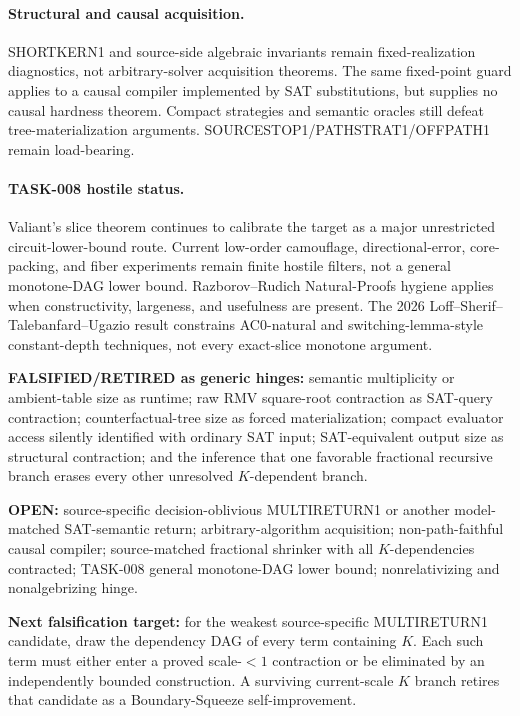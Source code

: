 \documentclass[11pt]{article}
\begin{document}
\paragraph{Structural and causal acquisition.}
SHORTKERN1 and source-side algebraic invariants remain fixed-realization diagnostics, not arbitrary-solver acquisition theorems. The same fixed-point guard applies to a causal compiler implemented by SAT substitutions, but supplies no causal hardness theorem. Compact strategies and semantic oracles still defeat tree-materialization arguments. SOURCESTOP1/PATHSTRAT1/OFFPATH1 remain load-bearing.

\paragraph{TASK-008 hostile status.}
Valiant's slice theorem continues to calibrate the target as a major unrestricted circuit-lower-bound route. Current low-order camouflage, directional-error, core-packing, and fiber experiments remain finite hostile filters, not a general monotone-DAG lower bound. Razborov--Rudich Natural-Proofs hygiene applies when constructivity, largeness, and usefulness are present. The 2026 Loff--Sherif--Talebanfard--Ugazio result constrains AC0-natural and switching-lemma-style constant-depth techniques, not every exact-slice monotone argument.

\textbf{FALSIFIED/RETIRED as generic hinges:} semantic multiplicity or ambient-table size as runtime; raw RMV square-root contraction as SAT-query contraction; counterfactual-tree size as forced materialization; compact evaluator access silently identified with ordinary SAT input; SAT-equivalent output size as structural contraction; and the inference that one favorable fractional recursive branch erases every other unresolved \(K\)-dependent branch.

\textbf{OPEN:} source-specific decision-oblivious MULTIRETURN1 or another model-matched SAT-semantic return; arbitrary-algorithm acquisition; non-path-faithful causal compiler; source-matched fractional shrinker with all \(K\)-dependencies contracted; TASK-008 general monotone-DAG lower bound; nonrelativizing and nonalgebrizing hinge.

\textbf{Next falsification target:} for the weakest source-specific MULTIRETURN1 candidate, draw the dependency DAG of every term containing \(K\). Each such term must either enter a proved scale-\(<1\) contraction or be eliminated by an independently bounded construction. A surviving current-scale \(K\) branch retires that candidate as a Boundary-Squeeze self-improvement.
\end{document}

